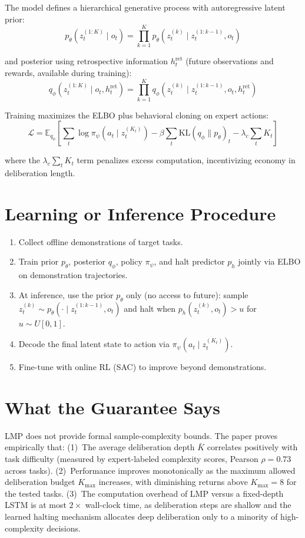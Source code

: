 \documentclass[10pt,twocolumn]{article}
\begin{document}
The model defines a hierarchical generative process with autoregressive
latent prior:
\[
p_\theta(z_t^{(1:K)} \mid o_t) = \prod_{k=1}^K
p_\theta\!\left(z_t^{(k)} \mid z_t^{(1:k-1)}, o_t\right)
\]

and posterior using retrospective information $h_t^{\text{ret}}$
(future observations and rewards, available during training):
\[
q_\phi(z_t^{(1:K)} \mid o_t, h_t^{\text{ret}}) = \prod_{k=1}^K
q_\phi\!\left(z_t^{(k)} \mid z_t^{(1:k-1)}, o_t, h_t^{\text{ret}}\right)
\]

Training maximizes the ELBO plus behavioral cloning on expert actions:
\[
\mathcal{L} = \mathbb{E}_{q_\phi}\!\left[
  \sum_t \log \pi_\psi(a_t \mid z_t^{(K_t)})
  - \beta \sum_t \mathrm{KL}\!\left(q_\phi \| p_\theta\right)_t
  - \lambda_c \sum_t K_t
\right]
\]

where the $\lambda_c \sum_t K_t$ term penalizes excess computation,
incentivizing economy in deliberation length.

\section{Learning or Inference Procedure}

\begin{enumerate}[itemsep=2pt,parsep=0pt]
  \item Collect offline demonstrations of target tasks.
  \item Train prior $p_\theta$, posterior $q_\phi$, policy $\pi_\psi$,
    and halt predictor $p_h$ jointly via ELBO on demonstration trajectories.
  \item At inference, use the prior $p_\theta$ only (no access to future):
    sample $z_t^{(k)} \sim p_\theta(\cdot \mid z_t^{(1:k-1)}, o_t)$
    and halt when $p_h(z_t^{(k)}, o_t) > u$ for $u \sim U[0,1]$.
  \item Decode the final latent state to action via $\pi_\psi(a_t \mid z_t^{(K_t)})$.
  \item Fine-tune with online RL (SAC) to improve beyond demonstrations.
\end{enumerate}

\section{What the Guarantee Says}

LMP does not provide formal sample-complexity bounds. The paper proves
empirically that: (1)~The average deliberation depth $\bar{K}$ correlates
positively with task difficulty (measured by expert-labeled complexity
scores, Pearson $\rho = 0.73$ across tasks). (2)~Performance improves
monotonically as the maximum allowed deliberation budget $K_{\max}$
increases, with diminishing returns above $K_{\max} = 8$ for the tested
tasks. (3)~The computation overhead of LMP versus a fixed-depth LSTM
is at most $2\times$ wall-clock time, as deliberation steps are shallow
and the learned halting mechanism allocates deep deliberation only to a
minority of high-complexity decisions.
\end{document}
